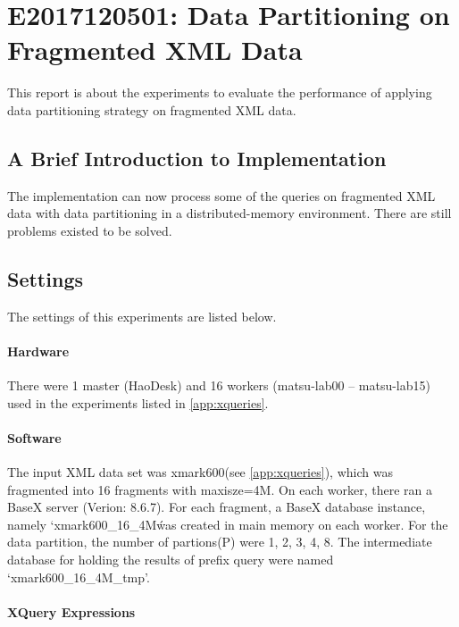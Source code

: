 

\section{E2017120501: Data Partitioning on Fragmented XML Data}

This report is about the experiments to evaluate the performance 
of applying data partitioning strategy on fragmented XML data. 


\subsection{A Brief Introduction to Implementation}

The implementation can now process some of the queries on fragmented 
XML data with data partitioning in a distributed-memory environment.
There are still problems existed to be solved.


\subsection{Settings}

The settings of this experiments are listed below.

\paragraph{Hardware}

There were 1 master (HaoDesk) and 16 workers (matsu-lab00 -- matsu-lab15) 
used in the experiments listed in \ref{app:xqueries}.



\paragraph{Software}
The input XML data set was xmark600(see \ref{app:xqueries}), which was 
fragmented into 16 fragments with maxisze=4M.
On each worker, there ran a BaseX server (Verion: 8.6.7). 
For each fragment, a BaseX database instance, namely `xmark600\_16\_4M\'
was created in main memory on each worker.
For the data partition, the number of partions(P) were  1, 2, 3, 4, 8.
The intermediate database for holding the results of prefix
query were named  `xmark600\_16\_4M\_tmp'.
 

\paragraph{XQuery Expressions}


